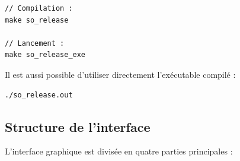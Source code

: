 \documentclass[a4paper,12pt]{article}
\begin{document}
\begin{verbatim}
// Compilation :
make so_release

// Lancement :
make so_release_exe
\end{verbatim}

Il est aussi possible d'utiliser directement l'exécutable compilé :

\begin{verbatim}
./so_release.out
\end{verbatim}

\subsection{Structure de l'interface}

L'interface graphique est divisée en quatre parties principales :
\end{document}
